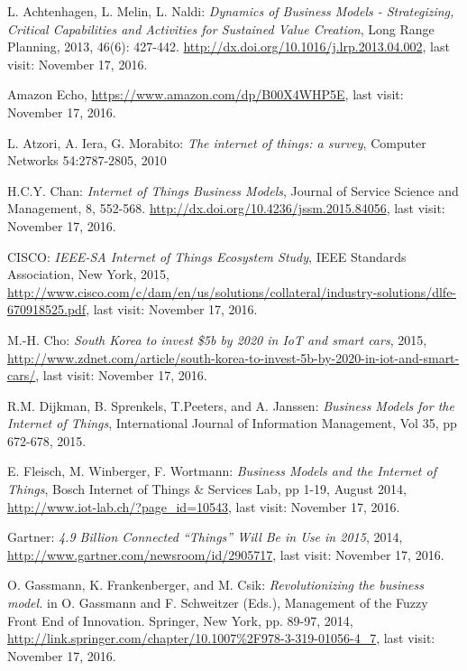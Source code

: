  \begin{thebibliography}{99}
	 L. Achtenhagen, L. Melin, L. Naldi: \emph{Dynamics of Business Models - Strategizing, Critical Capabilities and Activities for Sustained Value Creation}, Long Range Planning, 2013, 46(6): 427-442. \url{http://dx.doi.org/10.1016/j.lrp.2013.04.002},  last visit: November 17, 2016.
 
 	 Amazon Echo, \url{https://www.amazon.com/dp/B00X4WHP5E}, last visit: November 17, 2016.

	 L. Atzori, A. Iera, G. Morabito: \emph{The internet of things: a survey}, Computer Networks 54:2787-2805, 2010 

	 H.C.Y. Chan: \emph{Internet of Things Business Models}, Journal of Service Science and Management, 8, 552-568. \url{http://dx.doi.org/10.4236/jssm.2015.84056}, last visit: November 17, 2016.

	 CISCO: \emph{IEEE-SA Internet of Things Ecosystem Study}, IEEE Standards Association, New York, 2015, \url{http://www.cisco.com/c/dam/en/us/solutions/collateral/industry-solutions/dlfe-670918525.pdf}, last visit: November 17, 2016.

	 M.-H. Cho: \emph{South Korea to invest \$5b by 2020 in IoT and smart cars}, 2015, \url{http://www.zdnet.com/article/south-korea-to-invest-5b-by-2020-in-iot-and-smart-cars/}, last visit: November 17, 2016.

	 R.M. Dijkman, B. Sprenkels, T.Peeters, and A. Janssen: \emph{Business Models for the Internet of Things}, International Journal of Information Management, Vol 35, pp 672-678, 2015.

	 E. Fleisch, M. Winberger, F. Wortmann: \emph{Business Models and the Internet of Things}, Bosch Internet of Things \& Services Lab, pp 1-19, August 2014, \url{http://www.iot-lab.ch/?page_id=10543}, last visit: November 17, 2016.

 	 Gartner: \emph{4.9 Billion Connected ``Things'' Will Be in Use in 2015}, 2014, \url{http://www.gartner.com/newsroom/id/2905717}, last visit: November 17, 2016.
	
	 O. Gassmann, K. Frankenberger, and M. Csik: \emph{Revolutionizing the business model.} in O. Gassmann and F. Schweitzer (Eds.), Management of the Fuzzy Front End of Innovation. Springer, New York, pp. 89-97, 2014, \url{http://link.springer.com/chapter/10.1007%2F978-3-319-01056-4_7}, last visit: November 17, 2016.


\end{thebibliography}
